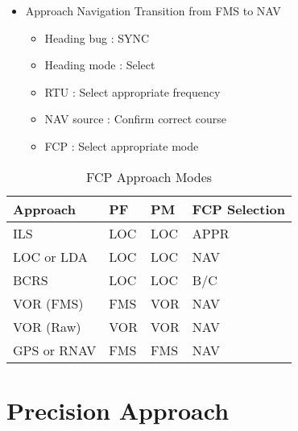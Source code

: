 \begin{itemize}
\item Approach Navigation Transition from FMS to NAV

\begin{itemize}
\item Heading bug : SYNC

\item Heading mode : Select

\item RTU : Select appropriate frequency

\item NAV source : Confirm correct course

\item FCP : Select appropriate mode

\end{itemize}

\end{itemize}

\begin{table}[htbp]
\begin{minipage}{\linewidth}
\setlength{\tymax}{0.5\linewidth}
\centering
\small
\caption{FCP Approach Modes}
\label{fcpapproachmodes}
\begin{tabulary}{\textwidth}{@{}llll@{}} \toprule
 Approach & PF & PM & FCP Selection \\
\midrule

 ILS   & LOC & LOC & APPR   \\
 LOC or LDA & LOC & LOC & NAV   \\
 BCRS  & LOC & LOC & B\slash C   \\
 VOR (FMS) & FMS & VOR & NAV   \\
 VOR (Raw) & VOR & VOR & NAV   \\
 GPS or RNAV & FMS & FMS & NAV   \\
\bottomrule

\end{tabulary}
\end{minipage}
\end{table}

\section{Precision Approach}
\label{precisionapproach}

